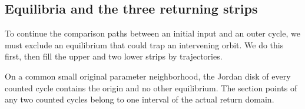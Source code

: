 \subsection{Equilibria and the three returning strips}

To continue the comparison paths between an initial input and an outer
cycle, we must exclude an equilibrium that could trap an intervening
orbit. We do this first, then fill the upper and two lower strips by
trajectories.

\begin{lemma}
\label{rw:fibre:enclosed-equilibria}
On a common small original parameter neighborhood, the Jordan disk
of every counted cycle contains the origin and no other equilibrium.
The section points of any two counted cycles belong to one interval
of the actual return domain.
\end{lemma}
